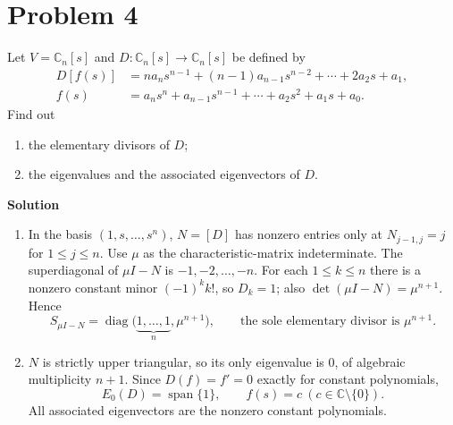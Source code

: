 \documentclass[UTF8,10pt,letterpaper,fontset=fandol]{ctexart}
\newcommand{\C}{\mathbb C}
\newcommand{\Solution}{\par\Needspace{4\baselineskip}\textbf{Solution}\par}
\begin{document}
\section{Problem 4}
Let $V=\C_n[s]$ and $D:\C_n[s]\to\C_n[s]$ be defined by
\[
\begin{aligned}
D[f(s)]&=na_ns^{n-1}+(n-1)a_{n-1}s^{n-2}+\cdots+2a_2s+a_1,\\
f(s)&=a_ns^n+a_{n-1}s^{n-1}+\cdots+a_2s^2+a_1s+a_0.
\end{aligned}
\]
Find out
\begin{enumerate}
\item the elementary divisors of $D$;
\item the eigenvalues and the associated eigenvectors of $D$.
\end{enumerate}
\Solution
\begin{enumerate}
\item In the basis $(1,s,\ldots,s^n)$, $N=[D]$ has nonzero entries only at $N_{j-1,j}=j$ for $1\le j\le n$.
Use $\mu$ as the characteristic-matrix indeterminate. The superdiagonal of $\mu I-N$ is $-1,-2,\ldots,-n$.
For each $1\le k\le n$ there is a nonzero constant minor $(-1)^k k!$, so $D_k=1$; also $\det(\mu I-N)=\mu^{n+1}$. Hence
\[
S_{\mu I-N}=\operatorname{diag}\bigl(\underbrace{1,\ldots,1}_{n},\mu^{n+1}\bigr),
\qquad\boxed{\text{the sole elementary divisor is }\mu^{n+1}}.
\]
\item $N$ is strictly upper triangular, so its only eigenvalue is $0$, of algebraic multiplicity $n+1$. Since $D(f)=f'=0$ exactly for constant polynomials,
\[
\boxed{E_0(D)=\operatorname{span}\{1\},\qquad f(s)=c\ (c\in\C\setminus\{0\})}.
\]
All associated eigenvectors are the nonzero constant polynomials.
\end{enumerate}
\end{document}
